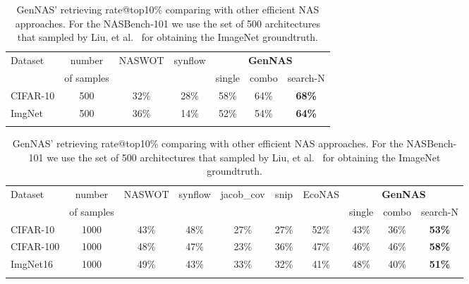 \documentclass{article}
\begin{document}
\begin{table}[!h]
\vspace{-8pt}
\scriptsize
  \caption{GenNAS' retrieving rate@top10\% comparing with other efficient NAS approaches. For the NASBench-101 we use the set of 500 architectures that sampled by Liu, et al.~\cite{liu2020labels} for obtaining the ImageNet groundtruth.}
  \label{table:GenNAS_rankingcorrelation_retrieve}
  \centering
\setlength{\tabcolsep}{3pt}

\begin{tabular}{lcccccc}
\Xhline{0.8pt}
\multicolumn{7}{l}{\textbf{NASBench-101}} \\ \hline
Dataset & number  & NASWOT & synflow &  \multicolumn{3}{c}{\textbf{GenNAS}} \\\cline{5-7}
     & of samples& ~\cite{mellor2020neural} & ~\cite{abdelfattah2021zero} & single & combo & search-N \\\hline
CIFAR-10 & 500 & 32\%&	28\%&	58\%&	64\%&	\textbf{68\%}\\
ImgNet &  500 & 36\%&	14\%&	52\%&	54\%&	\textbf{64\%}\\
\Xhline{0.8pt}
\vspace{-8pt}
\end{tabular}

\begin{tabular}{lcccccc|ccc}
\Xhline{0.8pt}
\multicolumn{7}{l}{\textbf{NASBench-201}} \\ \hline
Dataset & number & NASWOT & synflow &jacob\_cov & snip  & EcoNAS & \multicolumn{3}{c}{\textbf{GenNAS}} \\\cline{8-10}
&of samples&&& &  &\cite{zhou2020econas}  & single & combo & search-N \\\hline
CIFAR-10 &  1000 & 43\%&	48\%&	27\%&	27\%&	52\%&	43\%&	36\%&	\textbf{53\%}\\
CIFAR-100 & 1000 & 48\%&	47\%&	23\%&	36\%&	47\%&	46\%&	46\%&	\textbf{58\%}\\
ImgNet16 &1000 & 49\%&	43\%&	33\%&	32\%&	41\%&	48\%&	40\%&	\textbf{51\%}\\
\Xhline{0.8pt}
\end{tabular}


\end{table}
\end{document}

